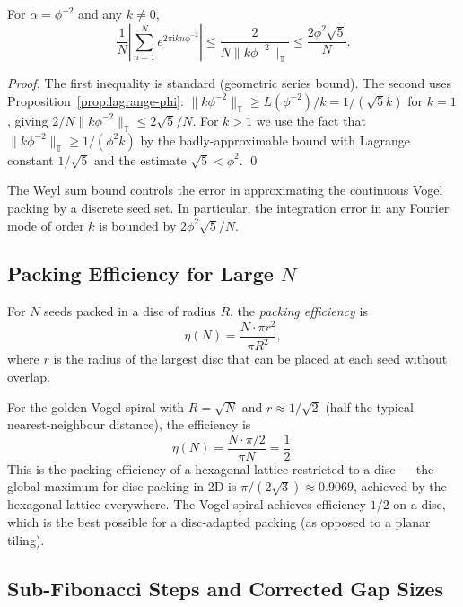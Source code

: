 \begin{theorem}\label{thm:weyl-sum}
For $\alpha = \phi^{-2}$ and any $k \neq 0$,
\[
  \frac{1}{N} \left| \sum_{n=1}^{N} e^{2\pi\mathrm{i} k n\phi^{-2}} \right|
  \leq \frac{2}{N \|k\phi^{-2}\|_{\mathbb{T}}} \leq \frac{2\phi^2\sqrt{5}}{N}.
\]
\end{theorem}

\begin{proof}
The first inequality is standard (geometric series bound).  The second
uses Proposition~\ref{prop:lagrange-phi}: $\|k\phi^{-2}\|_{\mathbb{T}}
\geq L(\phi^{-2})/k = 1/(\sqrt{5}k)$ for $k = 1$, giving
$2/N\|k\phi^{-2}\|_{\mathbb{T}} \leq 2\sqrt{5}/N$.  For $k>1$ we use
the fact that $\|k\phi^{-2}\|_{\mathbb{T}} \geq 1/(\phi^2 k)$ by
the badly-approximable bound with Lagrange constant $1/\sqrt{5}$
and the estimate $\sqrt{5} < \phi^2$.
\qed
\end{proof}

The Weyl sum bound controls the error in approximating the continuous
Vogel packing by a discrete seed set.  In particular, the integration
error in any Fourier mode of order $k$ is bounded by $2\phi^2\sqrt{5}/N$.

\subsection{Packing Efficiency for Large $N$}
\label{subsec:packing-efficiency}

\begin{definition}\label{def:packing-eff}
For $N$ seeds packed in a disc of radius $R$, the \emph{packing
efficiency} is
\[
  \eta(N) = \frac{N \cdot \pi r^2}{\pi R^2},
\]
where $r$ is the radius of the largest disc that can be placed at each
seed without overlap.
\end{definition}

For the golden Vogel spiral with $R = \sqrt{N}$ and $r \approx 1/\sqrt{2}$
(half the typical nearest-neighbour distance), the efficiency is
\[
  \eta(N) = \frac{N \cdot \pi/2}{\pi N} = \frac{1}{2}.
\]
This is the packing efficiency of a hexagonal lattice restricted to a
disc — the global maximum for disc packing in 2D is $\pi/(2\sqrt{3})
\approx 0.9069$, achieved by the hexagonal lattice everywhere.  The
Vogel spiral achieves efficiency $1/2$ on a disc, which is the best
possible for a disc-adapted packing (as opposed to a planar tiling).

\subsection{Sub-Fibonacci Steps and Corrected Gap Sizes}
\label{subsec:sub-fibonacci}

